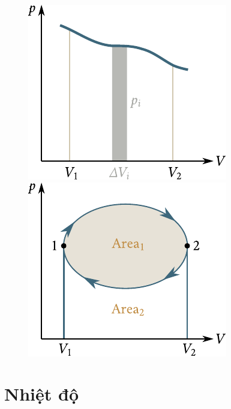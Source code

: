 \begin{figure}[!htb]
	\begin{minipage}[t]{0.5\linewidth}
		\begin{center}
			\includegraphics[scale=1.0]{figures/ch_10/fig_10_4.pdf}
			\caption[]{}
			\label{fig:10_4}
		\end{center}
	\end{minipage}
	\hspace{-0.0cm}
	\begin{minipage}[t]{0.5\linewidth}
		\begin{center}
			\includegraphics[scale=1.0]{figures/ch_10/fig_10_5.pdf}
			\caption[]{}
			\label{fig:10_5}
		\end{center}
	\end{minipage}
\end{figure}

\section{Nhiệt độ}\label{sec:10_7}

